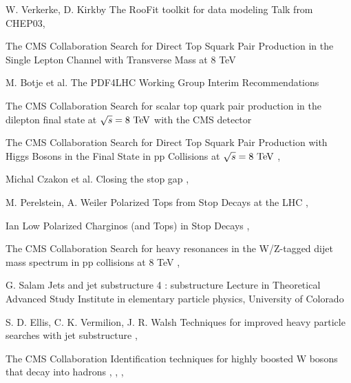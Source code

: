 {W. Verkerke, D. Kirkby}
{The RooFit toolkit for data modeling}
{Talk from CHEP03, }


{The CMS Collaboration}
{Search for Direct Top Squark Pair Production in the Single Lepton Channel
with Transverse Mass at 8 TeV}
{}

{M. Botje et al.}
{The PDF4LHC Working Group Interim Recommendations}
{}


{The CMS Collaboration}
{Search for scalar top quark pair production in the dilepton
final state at $\sqrt{s} = 8~\text{TeV}$ with the CMS detector}
{}

{The CMS Collaboration}
{Search for Direct Top Squark Pair Production with Higgs Bosons in the Final
State in pp Collisions at $\sqrt{s} = 8~\text{TeV}$}
{, }

{Michal Czakon et al.}
{Closing the stop gap}
{, }

{M. Perelstein, A. Weiler}
{Polarized Tops from Stop Decays at the LHC}
{, }

{Ian Low}
{Polarized Charginos (and Tops) in Stop Decays}
{, }


{The CMS Collaboration}
{Search for heavy resonances in the W/Z-tagged dijet mass
spectrum in pp collisions at 8 TeV}
{, }

{G. Salam}
{Jets and jet substructure 4 : substructure}
{Lecture in Theoretical Advanced Study Institute in elementary particle physics,
University of Colorado}

{S. D. Ellis, C. K. Vermilion, J. R. Walsh}
{Techniques for improved heavy particle searches with jet substructure}
{, }

{The CMS Collaboration}
{Identification techniques for highly boosted W bosons that decay into hadrons}
{, , , }

